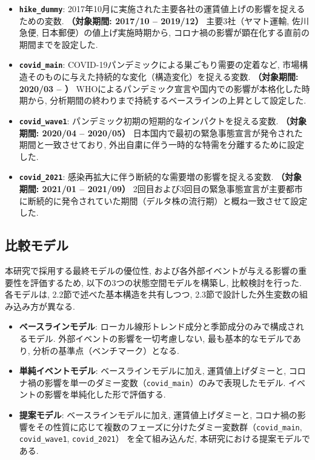 \documentclass{bcsj}
\begin{document}
\begin{itemize}
    \item \textbf{\texttt{hike\_dummy}}: 2017年10月に実施された主要各社の運賃値上げの影響を捉えるための変数. 
    \textbf{（対象期間: 2017/10 -- 2019/12）}
    主要3社（ヤマト運輸, 佐川急便, 日本郵便）の値上げ実施時期から, コロナ禍の影響が顕在化する直前の期間までを設定した. 

    \item \textbf{\texttt{covid\_main}}: COVID-19パンデミックによる巣ごもり需要の定着など, 市場構造そのものに与えた持続的な変化（構造変化）を捉える変数. 
    \textbf{（対象期間: 2020/03 -- ）}
    WHOによるパンデミック宣言や国内での影響が本格化した時期から, 分析期間の終わりまで持続するベースラインの上昇として設定した. 

    \item \textbf{\texttt{covid\_wave1}}: パンデミック初期の短期的なインパクトを捉える変数. 
    \textbf{（対象期間: 2020/04 -- 2020/05）}
    日本国内で最初の緊急事態宣言が発令された期間と一致させており, 外出自粛に伴う一時的な特需を分離するために設定した. 

    \item \textbf{\texttt{covid\_2021}}: 感染再拡大に伴う断続的な需要増の影響を捉える変数. 
    \textbf{（対象期間: 2021/01 -- 2021/09）}
    2回目および3回目の緊急事態宣言が主要都市に断続的に発令されていた期間（デルタ株の流行期）と概ね一致させて設定した. 
\end{itemize}



\subsection{比較モデル}
本研究で採用する最終モデルの優位性, および各外部イベントが与える影響の重要性を評価するため, 以下の3つの状態空間モデルを構築し, 比較検討を行った. 
各モデルは, 2.2節で述べた基本構造を共有しつつ, 2.3節で設計した外生変数の組み込み方が異なる. 

\begin{itemize}
    \item \textbf{ベースラインモデル}: ローカル線形トレンド成分と季節成分のみで構成されるモデル. 
    外部イベントの影響を一切考慮しない, 最も基本的なモデルであり, 分析の基準点（ベンチマーク）となる. 
    \item \textbf{単純イベントモデル}: ベースラインモデルに加え, 運賃値上げダミーと, 
    コロナ禍の影響を単一のダミー変数（\texttt{covid\_main}）のみで表現したモデル. イベントの影響を単純化した形で評価する. 
    \item \textbf{提案モデル}: ベースラインモデルに加え, 運賃値上げダミーと, 
    コロナ禍の影響をその性質に応じて複数のフェーズに分けたダミー変数群（\texttt{covid\_main}, \texttt{covid\_wave1}, \texttt{covid\_2021}）
    を全て組み込んだ, 本研究における提案モデルである. 
\end{itemize}
\end{document}
